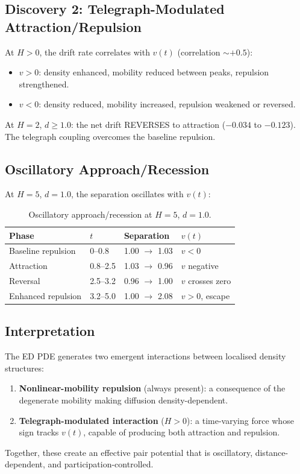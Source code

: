 \documentclass[11pt]{article}
\begin{document}
\subsection{Discovery 2: Telegraph-Modulated Attraction/Repulsion}

At \(H > 0\), the drift rate correlates with \(v(t)\) (correlation \(\sim +0.5\)):
\begin{itemize}
  \item \(v > 0\): density enhanced, mobility reduced between peaks, repulsion strengthened.
  \item \(v < 0\): density reduced, mobility increased, repulsion weakened or reversed.
\end{itemize}
At \(H = 2\), \(d \geq 1.0\): the net drift REVERSES to attraction (\(-0.034\) to \(-0.123\)). The telegraph coupling overcomes the baseline repulsion.

\subsection{Oscillatory Approach/Recession}

At \(H = 5\), \(d = 1.0\), the separation oscillates with \(v(t)\):

\begin{table}[h]
\centering
\begin{tabular}{@{}llll@{}}
\toprule
Phase & \(t\) & Separation & \(v(t)\) \\
\midrule
Baseline repulsion & 0--0.8 & 1.00 \(\to\) 1.03 & \(v < 0\) \\
Attraction & 0.8--2.5 & 1.03 \(\to\) 0.96 & \(v\) negative \\
Reversal & 2.5--3.2 & 0.96 \(\to\) 1.00 & \(v\) crosses zero \\
Enhanced repulsion & 3.2--5.0 & 1.00 \(\to\) 2.08 & \(v > 0\), escape \\
\bottomrule
\end{tabular}
\caption{Oscillatory approach/recession at \(H=5\), \(d=1.0\).}
\label{tab:oscillatory}
\end{table}

\subsection{Interpretation}

The ED PDE generates two emergent interactions between localised density structures:
\begin{enumerate}
  \item \textbf{Nonlinear-mobility repulsion} (always present): a consequence of the degenerate mobility making diffusion density-dependent.
  \item \textbf{Telegraph-modulated interaction} (\(H > 0\)): a time-varying force whose sign tracks \(v(t)\), capable of producing both attraction and repulsion.
\end{enumerate}
Together, these create an effective pair potential that is oscillatory, distance-dependent, and participation-controlled.
\end{document}
